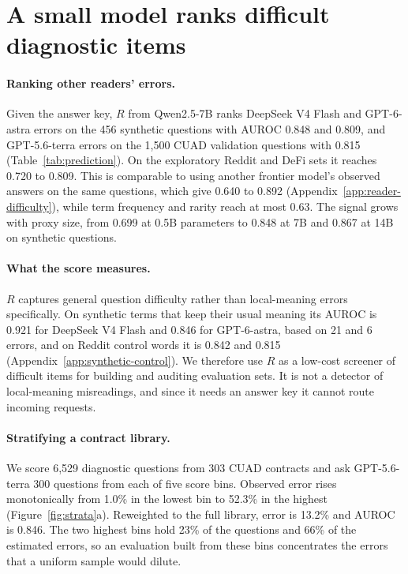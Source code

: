 \section{A small model ranks difficult diagnostic items}
\label{sec:predict}
\paragraph{Ranking other readers' errors.}
Given the answer key, $R$ from Qwen2.5-7B ranks DeepSeek V4 Flash and GPT-6-astra errors on the 456 synthetic questions with AUROC 0.848 and 0.809, and GPT-5.6-terra errors on the 1,500 CUAD validation questions with 0.815 (Table~\ref{tab:prediction}). On the exploratory Reddit and DeFi sets it reaches 0.720 to 0.809. This is comparable to using another frontier model's observed answers on the same questions, which give 0.640 to 0.892 (Appendix~\ref{app:reader-difficulty}), while term frequency and rarity reach at most 0.63. The signal grows with proxy size, from 0.699 at 0.5B parameters to 0.848 at 7B and 0.867 at 14B on synthetic questions.

\paragraph{What the score measures.}
$R$ captures general question difficulty rather than local-meaning errors specifically. On synthetic terms that keep their usual meaning its AUROC is 0.921 for DeepSeek V4 Flash and 0.846 for GPT-6-astra, based on 21 and 6 errors, and on Reddit control words it is 0.842 and 0.815 (Appendix~\ref{app:synthetic-control}). We therefore use $R$ as a low-cost screener of difficult items for building and auditing evaluation sets. It is not a detector of local-meaning misreadings, and since it needs an answer key it cannot route incoming requests.

\paragraph{Stratifying a contract library.}
We score 6,529 diagnostic questions from 303 CUAD contracts and ask GPT-5.6-terra 300 questions from each of five score bins. Observed error rises monotonically from 1.0\% in the lowest bin to 52.3\% in the highest (Figure~\ref{fig:strata}a). Reweighted to the full library, error is 13.2\% and AUROC is 0.846. The two highest bins hold 23\% of the questions and 66\% of the estimated errors, so an evaluation built from these bins concentrates the errors that a uniform sample would dilute.

